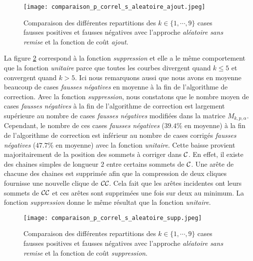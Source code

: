 \begin{figure}[htb!] 
\centering
\texttt{[image: comparaison\_p\_correl\_s\_aleatoire\_ajout.jpeg]}
\caption{ Comparaison des diff\'erentes repartitions des $k \in \{1,\cdots,9\}$ cases fausses positives et fausses n\'egatives avec l'approche {\em al\'eatoire sans remise} et la fonction de co\^ut {\em ajout}.  }
\label{comparaison_p_correl_s_aleatoire_ajout} 
\end{figure}

La figure \ref{comparaison_p_correl_s_aleatoire_supp} correspond \`a la fonction {\em suppression} et elle a le m\^eme comportement que la fonction {\em unitaire} parce que toutes les courbes divergent quand $k \le 5$ et convergent quand  $k > 5$. Ici nous remarquons aussi que nous avons en moyenne beaucoup de cases {\em fausses n\'egatives} en moyenne \`a la fin de l'algorithme de correction. 
Avec la fonction {\em suppression}, nous constatons que le nombre moyen de cases {\em fausses n\'egatives} \`a la fin de l'algorithme de correction est largement sup\'erieure au nombre de cases {\em fausses n\'egatives} modifi\'ees dans la matrice $M_{k,p,\alpha}$.
Cependant, le nombre de ces cases {\em fausses n\'egatives}  ($39.4\%$ en moyenne) \`a la fin de l'algorithme de correction est inf\'erieur au nombre de cases corrig\'es {\em fausses n\'egatives}  ($47.7\%$ en moyenne) avec la fonction {\em unitaire}. 
Cette baisse provient majoritairement de la position des sommets \`a corriger dans ${\cal C}$. 
En effet, il existe des chaines simples de longueur $2$ entre certains sommets de  ${\cal C}$.  Une ar\^ete de chacune des chaines est supprim\'ee afin que la compression de deux cliques fournisse une nouvelle clique de ${\cal CC}$. Cela fait que les ar\^etes incidentes ont leurs sommets de ${\cal CC}$ et ces ar\^etes sont supprim\'ees une fois sur deux au minimum. 
La fonction {\em suppression} donne le m\^eme r\'esultat que la fonction {\em unitaire}.

\begin{figure}[htb!] 
\centering
\texttt{[image: comparaison\_p\_correl\_s\_aleatoire\_supp.jpeg]}
\caption{ Comparaison des diff\'erentes repartitions des $k \in \{1,\cdots,9\}$ cases fausses positives et fausses n\'egatives avec l'approche {\em al\'eatoire sans remise} et la fonction de co\^ut {\em suppression}. }
\label{comparaison_p_correl_s_aleatoire_supp} 
\end{figure}

